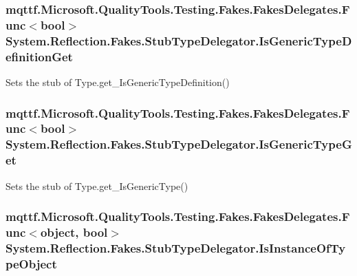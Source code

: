 \hypertarget{class_system_1_1_reflection_1_1_fakes_1_1_stub_type_delegator_a453f82cef5f387ec25c22138af75e807}{
\subsubsection[{Is\-Generic\-Type\-Definition\-Get}]{\setlength{\rightskip}{0pt plus 5cm}mqttf.\-Microsoft.\-Quality\-Tools.\-Testing.\-Fakes.\-Fakes\-Delegates.\-Func$<$bool$>$ System.\-Reflection.\-Fakes.\-Stub\-Type\-Delegator.\-Is\-Generic\-Type\-Definition\-Get}}\label{class_system_1_1_reflection_1_1_fakes_1_1_stub_type_delegator_a453f82cef5f387ec25c22138af75e807}


Sets the stub of Type.\-get\-\_\-\-Is\-Generic\-Type\-Definition()

\hypertarget{class_system_1_1_reflection_1_1_fakes_1_1_stub_type_delegator_a5080615829d13ebc4051fb3319caeec8}{
\subsubsection[{Is\-Generic\-Type\-Get}]{\setlength{\rightskip}{0pt plus 5cm}mqttf.\-Microsoft.\-Quality\-Tools.\-Testing.\-Fakes.\-Fakes\-Delegates.\-Func$<$bool$>$ System.\-Reflection.\-Fakes.\-Stub\-Type\-Delegator.\-Is\-Generic\-Type\-Get}}\label{class_system_1_1_reflection_1_1_fakes_1_1_stub_type_delegator_a5080615829d13ebc4051fb3319caeec8}


Sets the stub of Type.\-get\-\_\-\-Is\-Generic\-Type()

\hypertarget{class_system_1_1_reflection_1_1_fakes_1_1_stub_type_delegator_a983569b2ef8ea5cee567bce3436c7a64}{
\subsubsection[{Is\-Instance\-Of\-Type\-Object}]{\setlength{\rightskip}{0pt plus 5cm}mqttf.\-Microsoft.\-Quality\-Tools.\-Testing.\-Fakes.\-Fakes\-Delegates.\-Func$<$object, bool$>$ System.\-Reflection.\-Fakes.\-Stub\-Type\-Delegator.\-Is\-Instance\-Of\-Type\-Object}}\label{class_system_1_1_reflection_1_1_fakes_1_1_stub_type_delegator_a983569b2ef8ea5cee567bce3436c7a64}


